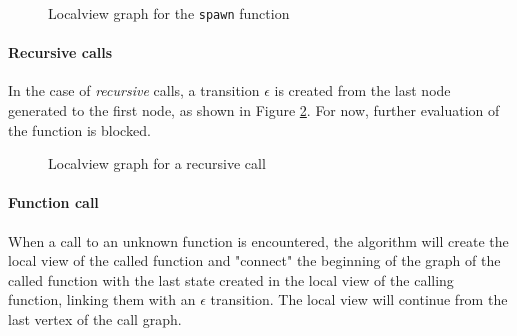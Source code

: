 \begin{figure}[!ht]
    \centering
    \caption{Localview graph for the \texttt{spawn} function}
    \label{grafo:spawn}
\end{figure}

\paragraph{Recursive calls}
In the case of \textit{recursive} calls, a transition $\epsilon$ is created from the last  
node generated to the first node, as shown in Figure \ref{grafo:ricors}.
For now, further evaluation of the function is blocked.

\begin{figure}[!ht]
    \centering
    \caption{Localview graph for a recursive call}
    \label{grafo:ricors}
\end{figure}

\paragraph{Function call}
When a call to an unknown function is encountered, the algorithm will create the local  
view of the called function and "connect" the beginning of the graph of the called  
function with the last state created in the local view of the calling function, linking  
them with an $\epsilon$ transition. The local view will continue from the last vertex of  
the call graph.

